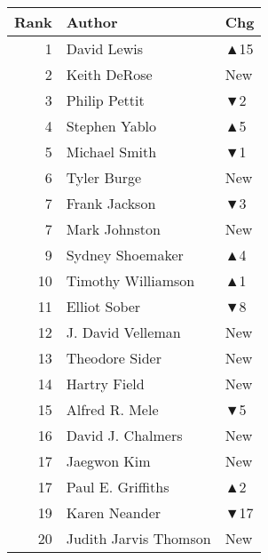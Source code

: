 \documentclass[
  10pt,
  letterpaper,
  DIV=11,
  numbers=noendperiod,
  twoside]{scrartcl}
\begin{document}
\begin{table}
\begin{minipage}{0.25\linewidth}
{\begin{tabular}{rll}
\toprule
Rank & Author & Chg\\
\midrule
1 & David Lewis & \textcolor[RGB]{34,178,34}{▲15}\\
2 & Keith DeRose & \textcolor[RGB]{34,178,34}{New}\\
3 & Philip Pettit & \textcolor[RGB]{178,34,34}{▼2}\\
4 & Stephen Yablo & \textcolor[RGB]{34,178,34}{▲5}\\
5 & Michael Smith & \textcolor[RGB]{178,34,34}{▼1}\\
6 & Tyler Burge & \textcolor[RGB]{34,178,34}{New}\\
7 & Frank Jackson & \textcolor[RGB]{178,34,34}{▼3}\\
7 & Mark Johnston & \textcolor[RGB]{34,178,34}{New}\\
9 & Sydney Shoemaker & \textcolor[RGB]{34,178,34}{▲4}\\
10 & Timothy Williamson & \textcolor[RGB]{34,178,34}{▲1}\\
11 & Elliot Sober & \textcolor[RGB]{178,34,34}{▼8}\\
12 & J. David Velleman & \textcolor[RGB]{34,178,34}{New}\\
13 & Theodore Sider & \textcolor[RGB]{34,178,34}{New}\\
14 & Hartry Field & \textcolor[RGB]{34,178,34}{New}\\
15 & Alfred R. Mele & \textcolor[RGB]{178,34,34}{▼5}\\
16 & David J. Chalmers & \textcolor[RGB]{34,178,34}{New}\\
17 & Jaegwon Kim & \textcolor[RGB]{34,178,34}{New}\\
17 & Paul E. Griffiths & \textcolor[RGB]{34,178,34}{▲2}\\
19 & Karen Neander & \textcolor[RGB]{178,34,34}{▼17}\\
20 & Judith Jarvis Thomson & \textcolor[RGB]{34,178,34}{New}\\
\bottomrule
\end{tabular}

}

\end{minipage}%
%
\begin{minipage}{0.25\linewidth}


\centering{

}
\end{minipage}
\end{table}
\end{document}

